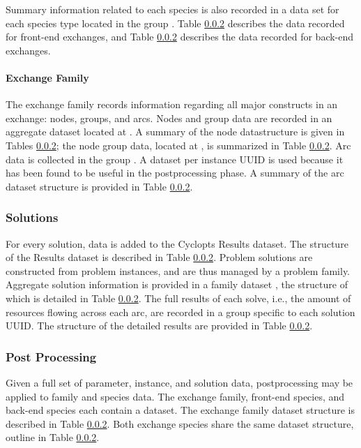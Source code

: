 Summary information related to each species is also recorded in a data set for
each species type located in the group . Table \ref{} describes the data recorded for front-end
exchanges, and Table \ref{} describes the data recorded for back-end exchanges.


\paragraph{Exchange Family}

The exchange family records information regarding all major constructs in an
exchange: nodes, groups, and arcs. Nodes and group data are recorded in an
aggregate dataset located at . A
summary of the node datastructure is given in Tables \ref{}; the node group
data, located at , is summarized
in Table \ref{}. Arc data is collected in the group
. A dataset per instance UUID is
used because it has been found to be useful in the postprocessing phase. A
summary of the arc dataset structure is provided in Table \ref{}.


\subsubsection{Solutions}

For every solution, data is added to the Cyclopts Results dataset. The structure
of the Results dataset is described in Table \ref{}. Problem solutions are
constructed from problem instances, and are thus managed by a problem
family. Aggregate solution information is provided in a family dataset
, the structure of
which is detailed in Table \ref{}. The full results of each solve, i.e., the
amount of resources flowing across each arc, are recorded in a group specific to
each solution UUID. The structure of the detailed results are provided in Table
\ref{}.


\subsubsection{Post Processing}

Given a full set of parameter, instance, and solution data, postprocessing may
be applied to family and species data. The exchange family, front-end species,
and back-end species each contain a  dataset. The exchange
family dataset structure is described in Table \ref{}. Both exchange species
share the same dataset structure, outline in Table \ref{}.

